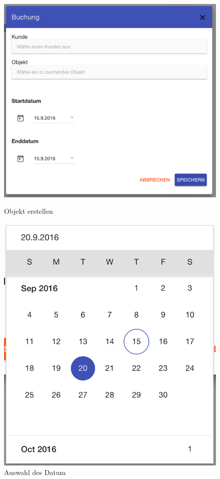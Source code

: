 \begin{figure}[H]
    \centering
    \begin{minipage}[t]{0.49\linewidth}
        \centering
        \includegraphics[width=\linewidth]{images/frontend_booking_new.png}
        \caption{Objekt erstellen}
        \label{frontend_booking_new}
    \end{minipage}
    \hfill
    \begin{minipage}[t]{0.49\linewidth}
        \centering
        \includegraphics[width=\linewidth]{images/frontend_booking_calender.png}
        \caption{Auswahl des Datum}        
        \label{frontend_booking_calender}
    \end{minipage}
\end{figure}


